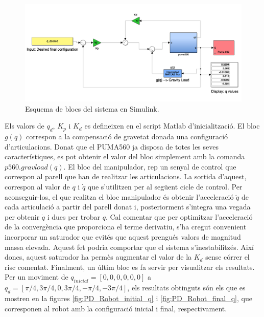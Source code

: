 \documentclass[]{article}
\begin{document}
\begin{figure}[H]
\centering
    \includegraphics[width = 1\linewidth]{images/PD_gravity_compensation_Simulink.png}
    \caption{Esquema de blocs del sistema en Simulink.}
    \label{fig:PD_simulink}
\end{figure}

Els valors de $q_{d}$, $K_{p}$ i $K_{d}$ es defineixen en el script Matlab d'inicialització. El bloc $g(q)$ correspon a la compensació de gravetat donada una configuració d'articulacions. Donat que el PUMA560 ja disposa de totes les seves característiques, es pot obtenir el valor del bloc simplement amb la comanda $p560.gravload(q)$. El bloc del manipulador, rep un senyal de control que correspon al parell que han de realitzar les articulacions. La sortida d'aquest, correspon al valor de $q$ i $\dot{q}$ que s'utilitzen per al següent cicle de control. Per aconseguir-los, el que realitza el bloc manipulador és obtenir l'acceleració $\ddot{q}$ de cada articulació a partir del parell donat i, posteriorment s'integra una vegada per obtenir $\dot{q}$ i dues per trobar $q$. Cal comentar que per optimitzar l’acceleració de la convergència que proporciona el terme derivatiu, s’ha cregut convenient incorporar un saturador que evités que aquest prengués valors de magnitud massa elevada. Aquest fet podria comportar que el sistema s’inestabilitzés. Així doncs, aquest saturador ha permès augmentar el valor de la $K_{d}$ sense córrer el risc comentat. Finalment, un últim bloc es fa servir per visualitzar els resultats. Per un moviment de $q_{inicial} = [0,0,0,0,0,0]$ a $q_{d} = [\pi/4,3\pi/4,0,3\pi/4,-\pi/4,-3\pi/4]$, els resultats obtinguts són els que es mostren en la figures \ref{fig:PD_Robot_initial_q} i \ref{fig:PD_Robot_final_q}, que corresponen al robot amb la configuració inicial i final, respectivament. 
\end{document}
